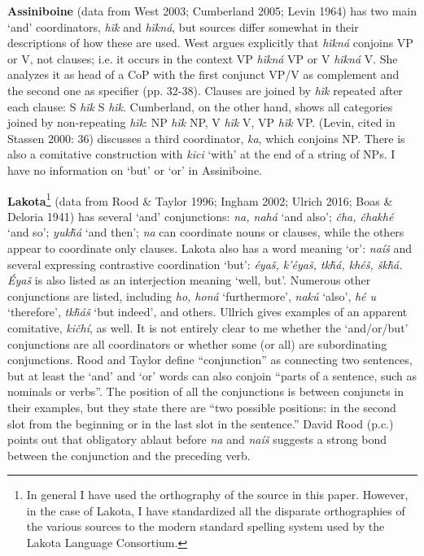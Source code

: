 \documentclass[output=paper]{LSP/langsci}
\begin{document}
\textbf{Assiniboine} (data from West 2003; Cumberland 2005; Levin 1964) has two main `and' coordinators, \textit{h\~ik} and \textit{h\~ikn\'a}, but sources differ somewhat in their descriptions of how these are used. West argues explicitly that \textit{h\~ikn\'a} conjoins VP or V, not clauses; i.e. it occurs in the context VP \textit{h\~ikn\'a} VP or V \textit{h\~ikn\'a} V. She analyzes it as head of a CoP with the first conjunct VP/V as complement and the second one as specifier (pp. 32-38). Clauses are joined by \textit{h\~ik} repeated after each clause: S \textit{h\~ik} S \textit{h\~ik}. Cumberland, on the other hand, shows all categories joined by non-repeating \textit{h\~ik}: NP \textit{h\~ik} NP, V \textit{h\~ik} V, VP \textit{h\~ik} VP. (Levin, cited in Stassen 2000: 36) discusses a third coordinator, \textit{ka}, which conjoins NP. There is also a comitative construction with \textit{kici} `with' at the end of a string of NPs. I have no information on `but' or `or' in Assiniboine.

\textbf{Lakota}\footnote{In general I have used the orthography of the source in this paper. However, in the case of Lakota, I have
standardized all the disparate orthographies of the various sources to the modern standard spelling system used by the Lakota Language Consortium.} (data from Rood \& Taylor 1996; Ingham 2002; Ulrich 2016; Boas \& Deloria 1941) has several `and' conjunctions: \textit{na, nah\'a} `and also'; \textit{\v{c}ha, \v{c}hakh\'e} `and so'; \textit{yuk\v{h}\'a} `and then'; \textit{na} can coordinate nouns or clauses, while the others appear to coordinate only clauses. Lakota also has a word meaning `or': \textit{na\'i\v{s}} and several expressing contrastive coordination `but': \textit{\'eya\v{s}, k'\'eya\v{s}, tk\v{h}\'a, kh\'e\v{s}, \v{s}k\v{h}\'a. \'Eya\v{s}} is also listed as an interjection meaning `well, but'. Numerous other conjunctions are listed, including \textit{ho, hon\'a} `furthermore', \textit{nak\'u} `also', \textit{h\'e u} `therefore', \textit{tk\v{h}\'a\v{s}} `but indeed', and others. Ullrich gives examples of an apparent comitative, \textit{ki\v{c}h\'i}, as well. It is not entirely clear to me whether the `and/or/but' conjunctions are all coordinators or whether some (or all) are subordinating conjunctions. Rood and Taylor define ``conjunction'' as connecting two sentences, but at least the `and' and `or' words can also conjoin ``parts of a sentence, such as nominals or verbs''. The position of all the conjunctions is between conjuncts in their examples, but they state there are ``two possible positions: in the second slot from the beginning or in the last slot in the sentence.'' David Rood (p.c.) points out that obligatory ablaut before \textit{na} and \textit{na\'i\v{s}} suggests a strong bond between the conjunction and the preceding verb.
\end{document}
